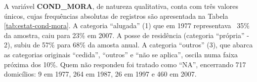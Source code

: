 \begin{table}[htb]
\centering

\end{table}


\newpage 

A variável \textbf{COND_MORA}, de natureza qualitativa, conta com três valores únicos, cujas frequências absolutas de registros são apresentada na Tabela \ref{tab:estat-cond-mora}. 
A categoria ``alugada'' (1) que em 1977 representava ~35\% da amostra, caiu para 23\% em 2007. A posse de residência (categoria ``própria'' - 2), subiu de 57\% para 68\% da amosta anual. A categoria ``outros'' (3), que abarca as categorias originais ``cedida'', ``outros'' e ``não se aplica'', oscila numa faixa próxima dos 10\%. Quem não respondeu foi tratado como ``NA'', encerrando 717 domicílios: 9 em 1977, 264 em 1987, 26 em 1997 e 460 em 2007.


